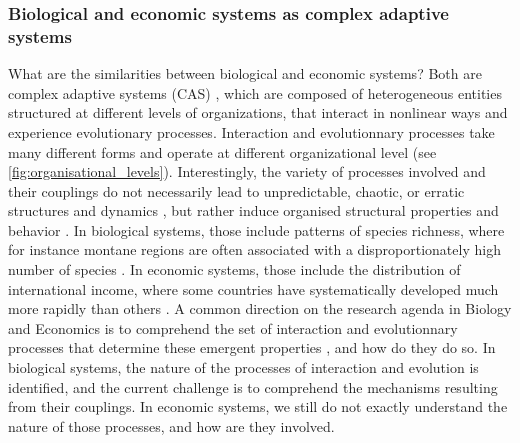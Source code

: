 \subsubsection*{Biological and economic systems as complex adaptive systems}
What are the similarities between biological and economic systems? Both are complex adaptive systems (CAS) \cite{Levin2002}, which are composed of heterogeneous entities structured at different levels of organizations, that interact in nonlinear ways and experience evolutionary processes. 
% 
Interaction and evolutionnary processes take many different forms and operate at different organizational level \cite{Levin1998} (see \cref{fig:organisational_levels}).
% 
Interestingly, the variety of processes involved and their couplings do not necessarily lead to unpredictable, chaotic, or erratic structures and dynamics \cite{Olff2009}, but rather induce organised structural properties and behavior \cite{mitchell2009complexity}. 
% 
In biological systems, those include patterns of species richness, where for instance montane regions are often associated with a disproportionately high number of species \cite{Rahbek2019}. In economic systems, those include the distribution of international income, where some countries have systematically developed much more rapidly than others \cite{acemoglu2001colonial}. 
% 
A common direction on the research agenda in Biology and Economics is to comprehend the set of interaction and evolutionnary processes that determine these emergent properties \cite{Nordbotten2018}, and how do they do so.
% 
In biological systems, the nature of the processes of interaction and evolution is identified, and the current challenge is to comprehend the mechanisms resulting from their couplings.
% 
In economic systems, we still do not exactly understand the nature of those processes, and how are they involved. 
% 
% 
% 

